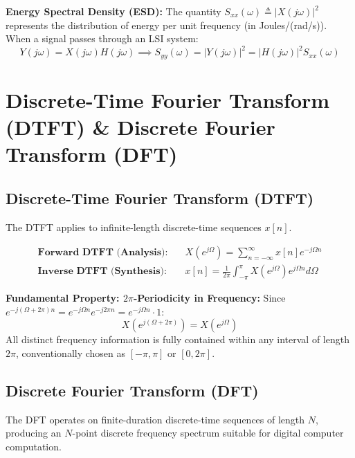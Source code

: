 \documentclass[12pt,a4paper]{article}
\begin{document}
\textbf{Energy Spectral Density (ESD):}
The quantity $S_{xx}(\omega) \triangleq |X(j\omega)|^2$ represents the distribution of energy per unit frequency (in Joules/(rad/s)). When a signal passes through an LSI system:
\begin{equation}
  Y(j\omega) = X(j\omega) H(j\omega) \implies S_{yy}(\omega) = |Y(j\omega)|^2 = |H(j\omega)|^2 S_{xx}(\omega)
\end{equation}

\section{Discrete-Time Fourier Transform (DTFT) \& Discrete Fourier Transform (DFT)}

\subsection{Discrete-Time Fourier Transform (DTFT)}
The DTFT applies to infinite-length discrete-time sequences $x[n]$.

\begin{tcolorbox}[defbox, title={\textbf{Definition: DTFT and Inverse DTFT}}]
\begin{align}
  \textbf{Forward DTFT (Analysis):} \quad &X(e^{j\Omega}) = \sum_{n=-\infty}^{\infty} x[n] e^{-j\Omega n} \\
  \textbf{Inverse DTFT (Synthesis):} \quad &x[n] = \frac{1}{2\pi} \int_{-\pi}^{\pi} X(e^{j\Omega}) e^{j\Omega n} d\Omega
\end{align}
\end{tcolorbox}

\textbf{Fundamental Property: $2\pi$-Periodicity in Frequency:}
Since $e^{-j(\Omega + 2\pi) n} = e^{-j\Omega n} e^{-j 2\pi n} = e^{-j\Omega n} \cdot 1$:
\begin{equation}
  X(e^{j(\Omega + 2\pi)}) = X(e^{j\Omega})
\end{equation}
All distinct frequency information is fully contained within any interval of length $2\pi$, conventionally chosen as $[-\pi, \pi]$ or $[0, 2\pi]$.

\subsection{Discrete Fourier Transform (DFT)}
The DFT operates on finite-duration discrete-time sequences of length $N$, producing an $N$-point discrete frequency spectrum suitable for digital computer computation.
\end{document}
